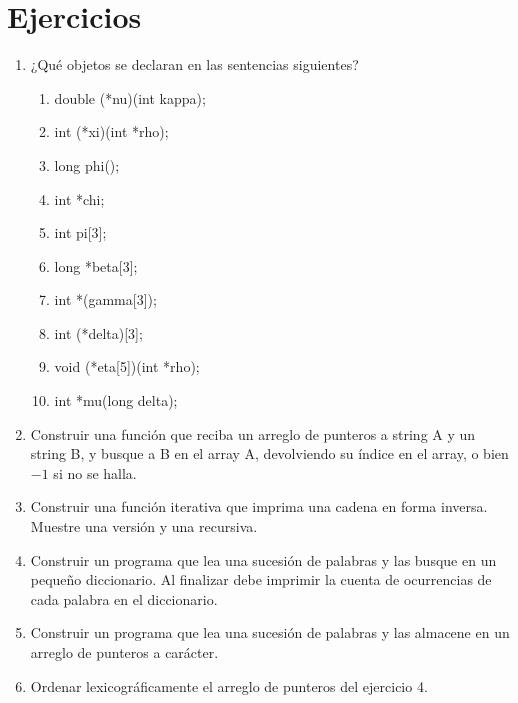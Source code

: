 \section{Ejercicios}
\begin{enumerate}

\item ¿Qué objetos se declaran en las sentencias siguientes?
\begin{enumerate}[label=\alph*.]
	\item double (*nu)(int kappa);
	\item int (*xi)(int *rho);
	\item long phi();
	\item int *chi;
	\item int pi[3];
	\item long *beta[3];
	\item int *(gamma[3]);
	\item int (*delta)[3];
	\item void (*eta[5])(int *rho);
	\item int *mu(long delta);
\end{enumerate}

\item Construir una función que reciba un arreglo de punteros a string A y un
string B, y busque a B en el array A, devolviendo su índice en el array, o bien
$-1$ si no se halla.
\item Construir una función iterativa que imprima una cadena en forma inversa.
Muestre una versión y una recursiva.
\item Construir un programa que lea una sucesión de palabras y las busque en un
pequeño diccionario. Al finalizar debe imprimir la cuenta de ocurrencias de
cada palabra en el diccionario.
\item Construir un programa que lea una sucesión de palabras y las almacene en un
arreglo de punteros a carácter.
\item Ordenar lexicográficamente el arreglo de punteros del ejercicio 4.
\end{enumerate}

